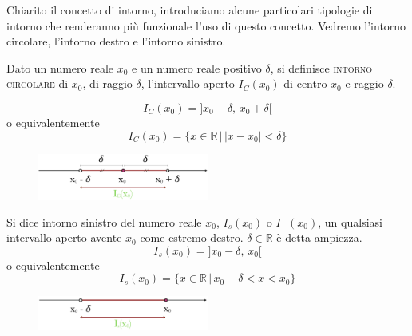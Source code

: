 Chiarito il concetto di intorno, introduciamo alcune particolari tipologie di 
intorno che renderanno più funzionale l'uso di questo concetto. Vedremo 
l'intorno circolare, l'intorno destro e l'intorno sinistro.

\begin{definizione}
  Dato un numero reale \(x_0\) e un numero reale positivo \(\delta\), si 
definisce \textsc{intorno circolare} di \(x_0\), di raggio \(\delta\), 
l'intervallo aperto \(I_C(x_0)\) di centro \(x_0\) e raggio \(\delta\).
\end{definizione}

\begin{equation}
  I_C(x_0)=]x_0-\delta,\,x_0+\delta[
\end{equation}
o equivalentemente
 \begin{equation}
  I_C(x_0)=\{x\in \mathbb{R}\,\vert\,\vert x-x_0\vert<\delta\}
\end{equation}

\begin{figure}[h!]
  \centering
  \includegraphics[width=0.5\textwidth]{img/top_2.png}%
\end{figure}


\begin{definizione}
  Si dice intorno sinistro del numero reale \(x_0\), \(I_s(x_0)\) o 
\(I^-(x_0)\), un qualsiasi intervallo aperto avente \(x_0\) come estremo 
destro. 
\(\delta\in\mathbb{R}\) è detta ampiezza.
\begin{equation}
  I_s(x_0)=]x_0-\delta,\,x_0[
\end{equation}
o equivalentemente
\begin{equation}
  I_s(x_0)=\{x\in \mathbb{R}\,\vert\, x_0-\delta < x<x_0\}
\end{equation}
\end{definizione}

\begin{figure}[h!]
  \centering
  \includegraphics[width=0.5\textwidth]{img/top_3.png}%
\end{figure}

